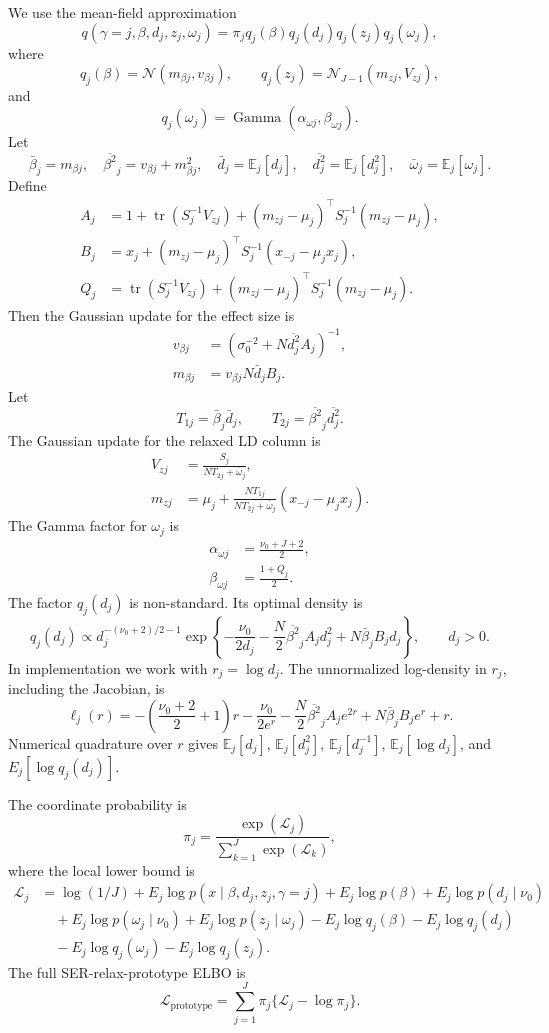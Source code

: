 \documentclass[11pt]{article}
\newcommand{\E}{\mathbb E}
\newcommand{\tr}{\operatorname{tr}}
\newcommand{\Gam}{\operatorname{Gamma}}
\newcommand{\Normal}{\mathcal N}
\begin{document}
We use the mean-field approximation
\[
q(\gamma=j,\beta,d_j,z_j,\omega_j)
=
\pi_j q_j(\beta)q_j(d_j)q_j(z_j)q_j(\omega_j),
\]
where
\[
q_j(\beta)=\Normal(m_{\beta j},v_{\beta j}),\qquad
q_j(z_j)=\Normal_{J-1}(m_{zj},V_{zj}),
\]
and
\[
q_j(\omega_j)=\Gam(\alpha_{\omega j},\beta_{\omega j}).
\]
Let
\[
\bar\beta_j=m_{\beta j},\quad
\overline{\beta^2}_j=v_{\beta j}+m_{\beta j}^2,\quad
\bar d_j=\E_j[d_j],\quad
\overline{d_j^2}=\E_j[d_j^2],\quad
\bar\omega_j=\E_j[\omega_j].
\]
Define
\begin{align}
A_j
&=
1+\tr(S_j^{-1}V_{zj})
+(m_{zj}-\mu_j)^\top S_j^{-1}(m_{zj}-\mu_j),\\
B_j
&=
x_j+(m_{zj}-\mu_j)^\top S_j^{-1}(x_{-j}-\mu_jx_j),\\
Q_j
&=
\tr(S_j^{-1}V_{zj})
+(m_{zj}-\mu_j)^\top S_j^{-1}(m_{zj}-\mu_j).
\end{align}
Then the Gaussian update for the effect size is
\begin{align}
v_{\beta j}
&=
\left(\sigma_0^{-2}+N\overline{d_j^2}A_j\right)^{-1},\\
m_{\beta j}
&=
v_{\beta j}N\bar d_jB_j.
\end{align}
Let
\[
T_{1j}=\bar\beta_j\bar d_j,\qquad
T_{2j}=\overline{\beta^2}_j\overline{d_j^2}.
\]
The Gaussian update for the relaxed LD column is
\begin{align}
V_{zj}
&=
\frac{S_j}{NT_{2j}+\bar\omega_j},\\
m_{zj}
&=
\mu_j+
\frac{NT_{1j}}{NT_{2j}+\bar\omega_j}
(x_{-j}-\mu_jx_j).
\end{align}
The Gamma factor for \(\omega_j\) is
\begin{align}
\alpha_{\omega j}
&=
\frac{\nu_0+J+2}{2},\\
\beta_{\omega j}
&=
\frac{1+Q_j}{2}.
\end{align}
The factor \(q_j(d_j)\) is non-standard. Its optimal density is
\[
q_j(d_j)
\propto
d_j^{-(\nu_0+2)/2-1}
\exp\left\{
-\frac{\nu_0}{2d_j}
-\frac{N}{2}\overline{\beta^2}_jA_jd_j^2
+N\bar\beta_jB_jd_j
\right\},
\qquad d_j>0.
\]
In implementation we work with \(r_j=\log d_j\). The unnormalized
log-density in \(r_j\), including the Jacobian, is
\[
\ell_j(r)
=
-\left(\frac{\nu_0+2}{2}+1\right)r
-\frac{\nu_0}{2e^r}
-\frac{N}{2}\overline{\beta^2}_jA_je^{2r}
+N\bar\beta_jB_je^r
+r.
\]
Numerical quadrature over \(r\) gives
\(\E_j[d_j]\), \(\E_j[d_j^2]\), \(\E_j[d_j^{-1}]\),
\(\E_j[\log d_j]\), and \(E_j[\log q_j(d_j)]\).

The coordinate probability is
\[
\pi_j=
\frac{\exp(\mathcal L_j)}
{\sum_{k=1}^J\exp(\mathcal L_k)},
\]
where the local lower bound is
\begin{align}
\mathcal L_j
&=
\log(1/J)
+E_j\log p(x\mid \beta,d_j,z_j,\gamma=j)
+E_j\log p(\beta)
+E_j\log p(d_j\mid\nu_0) \nonumber\\
&\quad
+E_j\log p(\omega_j\mid\nu_0)
+E_j\log p(z_j\mid\omega_j)
-E_j\log q_j(\beta)
-E_j\log q_j(d_j) \nonumber\\
&\quad
-E_j\log q_j(\omega_j)
-E_j\log q_j(z_j).
\end{align}
The full SER-relax-prototype ELBO is
\[
\mathcal L_{\mathrm{prototype}}
=
\sum_{j=1}^J
\pi_j\{\mathcal L_j-\log\pi_j\}.
\]
\end{document}
